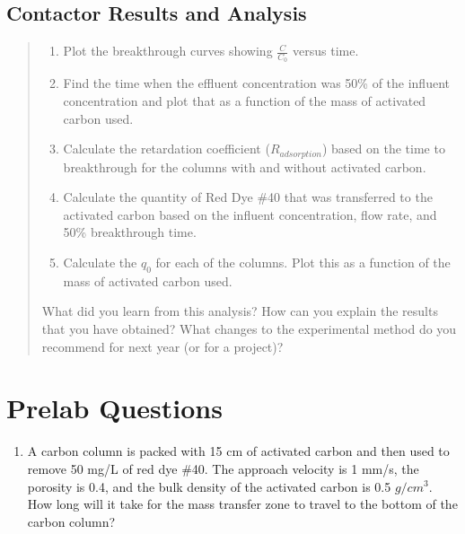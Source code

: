 \documentclass[letterpaper,10pt,english]{sphinxmanual}
\begin{document}
\subsection{Contactor Results and Analysis}
\label{\detokenize{Adsorption/Adsorption:contactor-results-and-analysis}}\begin{quote}
\begin{enumerate}
\item {} 
Plot the breakthrough curves showing \(\frac{C}{C_0}\) versus time.

\item {} 
Find the time when the effluent concentration was 50\% of the influent concentration and plot that as a function of the mass of activated carbon used.

\item {} 
Calculate the retardation coefficient (\(R_{adsorption}\)) based on the time to breakthrough for the columns with and without activated carbon.

\item {} 
Calculate the quantity of Red Dye \#40 that was transferred to the activated carbon based on the influent concentration, flow rate, and 50\% breakthrough time.

\item {} 
Calculate the \(q_0\) for each of the columns. Plot this as a function of the mass of activated carbon used.

\end{enumerate}

What did you learn from this analysis? How can you explain the results that you have obtained? What changes to the experimental method do you recommend for next year (or for a project)?
\end{quote}


\section{Prelab Questions}
\label{\detokenize{Adsorption/Adsorption:prelab-questions}}\label{\detokenize{Adsorption/Adsorption:heading-adsorption-pre-laboratory-questions}}\begin{enumerate}
\item {} 
A carbon column is packed with 15 cm of activated carbon and then used to remove 50 mg/L of red dye \#40. The approach velocity is 1 mm/s, the porosity is 0.4, and the bulk density of the activated carbon is 0.5 \(g/cm^3\). How long will it take for the mass transfer zone to travel to the bottom of the carbon column?

\end{enumerate}
\end{document}

